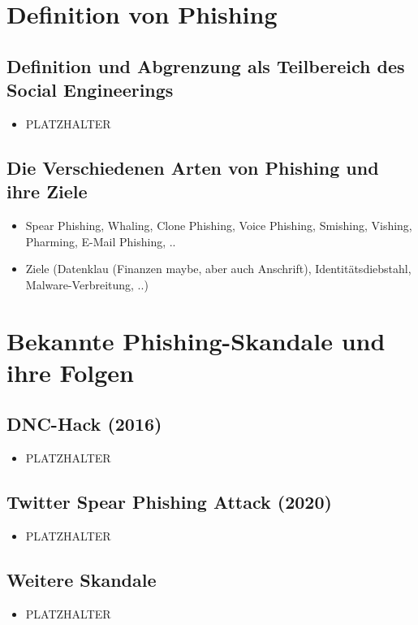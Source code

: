 \documentclass[12pt, a4paper, oneside]{scrartcl}
\begin{document}
\clearpage
\section{Definition von Phishing}

\subsection{Definition und Abgrenzung als Teilbereich des Social Engineerings}
\begin{itemize}
  \item PLATZHALTER
\end{itemize}

\subsection{Die Verschiedenen Arten von Phishing und ihre Ziele}
\begin{itemize}
  \item Spear Phishing, Whaling, Clone Phishing, Voice Phishing, Smishing, Vishing, Pharming, E-Mail Phishing, ..
  \item Ziele (Datenklau (Finanzen maybe, aber auch Anschrift), Identitätsdiebstahl, Malware-Verbreitung, ..)
\end{itemize}

\clearpage
\section{Bekannte Phishing-Skandale und ihre Folgen}

\subsection{DNC-Hack (2016)}
\begin{itemize}
  \item PLATZHALTER
\end{itemize}

\subsection{Twitter Spear Phishing Attack (2020)}
\begin{itemize}
  \item PLATZHALTER
\end{itemize}

\subsection{Weitere Skandale}
\begin{itemize}
  \item PLATZHALTER
\end{itemize}
\end{document}
